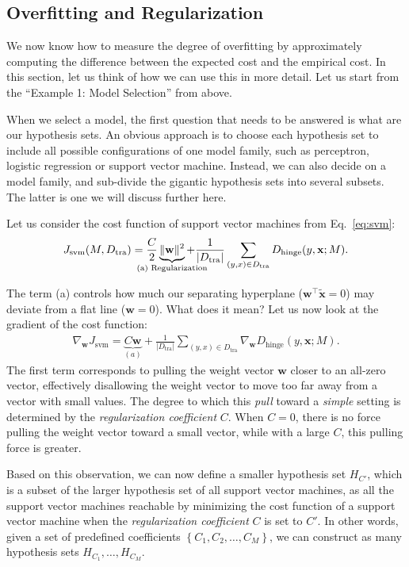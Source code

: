 \documentclass{report}
\newcommand{\vect}[1]{\mathbf{#1}}
\newcommand{\vx}[0]{\vect{x}}
\newcommand{\vw}[0]{\vect{w}}
\newcommand{\hinge}{\text{hinge}}
\newcommand{\tra}{\text{tra}}
\begin{document}
\subsection{Overfitting and Regularization}

We now know how to measure the degree of overfitting by approximately computing
the difference between the expected cost and the empirical cost. In this
section, let us think of how we can use this in more detail.  Let us start from
the ``Example 1: Model Selection'' from above. 

When we select a model, the first question that needs to be answered is what are
our hypothesis sets. An obvious approach is to choose each hypothesis set to
include all possible configurations of one model family, such as perceptron,
logistic regression or support vector machine. Instead, we can also decide on a
model family, and sub-divide the gigantic hypothesis sets into several subsets.
The latter is one we will discuss further here.

Let us consider the cost function of support vector machines from
Eq.~\eqref{eq:svm}: 
\begin{align*}
    J_{\text{svm}}(M,D_{\tra}) = \frac{C}{2}
    \underbrace{\|\vw\|^2}_{\mathclap{\text{(a) Regularization}}} + 
    \frac{1}{|D_{\tra}|} \sum_{(y,x)
    \in D_{\tra}} D_{\hinge}(y, \vx; M).
\end{align*}

The term (a) controls how much our separating hyperplane ($\vw^\top
\tilde{\vx}=0$) may deviate from a flat line ($\vw = 0$). What does it mean? Let
us now look at the gradient of the cost function:
\begin{align*}
    \nabla_{\vw} J_{\text{svm}} = 
    \underbrace{
    C \vw 
}_{(a)}
    + 
    \frac{1}{|D_{\tra}|} \sum_{(y,x)
    \in D_{\tra}} \nabla_{\vw} D_{\hinge}(y, \vx; M).
\end{align*}
The first term corresponds to pulling the weight vector $\vw$ closer to an
all-zero vector, effectively disallowing the weight vector to move too far away
from a vector with small values. The degree to which this {\it pull} toward a
{\it simple} setting is determined by the {\it regularization coefficient} $C$.
When $C=0$, there is no force pulling the weight vector toward a small vector,
while with a large $C$, this pulling force is greater. 

Based on this observation, we can now define a smaller hypothesis set $H_{C'}$,
which is a subset of the larger hypothesis set of all support vector machines,
as all the support vector machines reachable by minimizing the cost function of
a support vector machine when the {\it regularization coefficient} $C$ is set to
$C'$. In other words, given a set of predefined coefficients $\left\{ C_1, C_2,
\ldots, C_M\right\}$, we can construct as many hypothesis sets $H_{C_1}, \ldots,
H_{C_M}$. 
\end{document}

